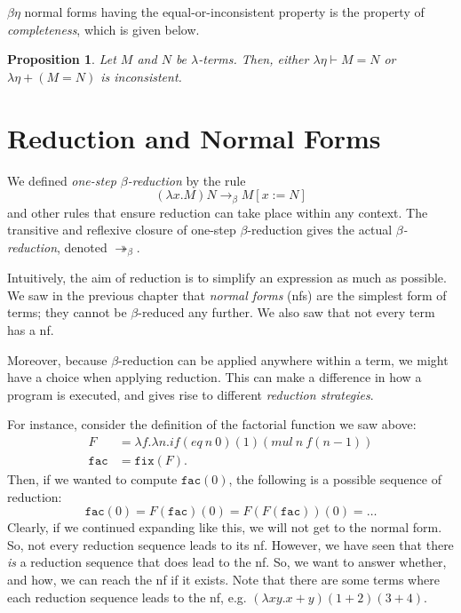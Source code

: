 \documentclass[a4paper, openany]{memoir}
\newtheorem{proposition}{Proposition}[section]
\theoremstyle{definition}
\begin{document}
    $\beta \eta$ normal forms having the equal-or-inconsistent property is the property of \emph{completeness}, which is given below.
    \begin{proposition}
        Let $M$ and $N$ be $\lambda$-terms. Then, either $\lambda \eta \vdash M = N$ or $\lambda \eta + (M = N)$ is inconsistent.
    \end{proposition}
    \newpage

    \section{Reduction and Normal Forms}
    We defined \emph{one-step $\beta$-reduction} by the rule
    \[(\lambda x.M) N \to_\beta M[x := N]\]
    and other rules that ensure reduction can take place within any context. The transitive and reflexive closure of one-step $\beta$-reduction gives the actual \emph{$\beta$-reduction}, denoted $\twoheadrightarrow_\beta$. 

    Intuitively, the aim of reduction is to simplify an expression as much as possible. We saw in the previous chapter that \emph{normal forms} (nfs) are the simplest form of terms; they cannot be $\beta$-reduced any further. We also saw that not every term has a nf.

    Moreover, because $\beta$-reduction can be applied anywhere within a term, we might have a choice when applying reduction. This can make a difference in how a program is executed, and gives rise to different \emph{reduction strategies}. 
    
    For instance, consider the definition of the factorial function we saw above:
    \begin{align*}
        F &= \lambda f.\lambda n.\textit{if}(\textit{eq} \ n \ 0)(1)(\textit{mul} \ n \ f(n-1)) \\
        \texttt{fac} &= \texttt{fix}(F).
    \end{align*}
    Then, if we wanted to compute $\texttt{fac}(0)$, the following is a possible sequence of reduction:
    \[\texttt{fac}(0) = F(\texttt{fac})(0) = F(F(\texttt{fac}))(0) = \dots \]
    Clearly, if we continued expanding like this, we will not get to the normal form. So, not every reduction sequence leads to its nf. However, we have seen that there \emph{is} a reduction sequence that does lead to the nf. So, we want to answer whether, and how, we can reach the nf if it exists. Note that there are some terms where each reduction sequence leads to the nf, e.g. $(\lambda xy. x + y)(1 + 2)(3 + 4)$.
\end{document}
